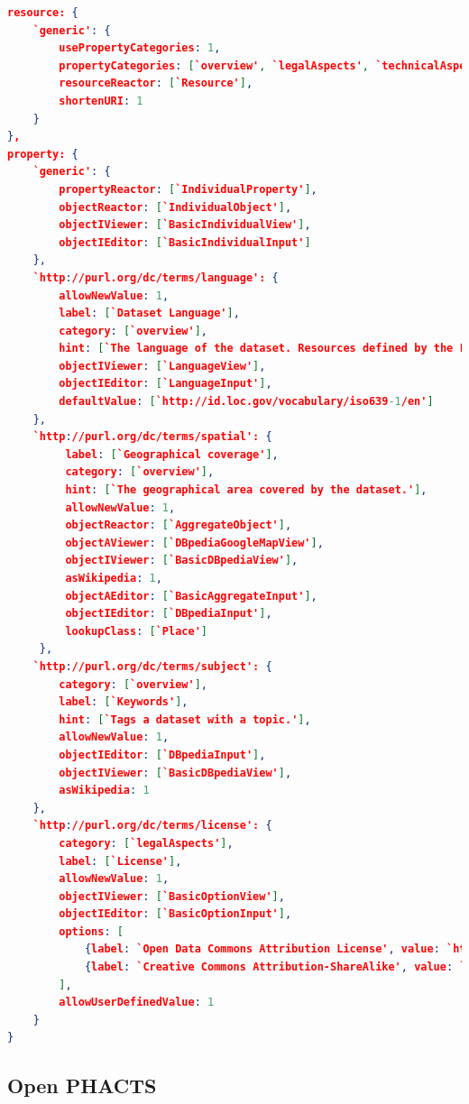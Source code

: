 \documentclass{acm_proc_article-sp}
\begin{document}
\begin{lstlisting}[language=json,firstnumber=1, label=code:config, caption=An excerpt of the LD-Reactor configuration for the RISIS metadata editor.]
resource: {
    `generic': {
        usePropertyCategories: 1,
        propertyCategories: [`overview', `legalAspects', `technicalAspects'],
        resourceReactor: [`Resource'],
        shortenURI: 1
    }
},
property: {
    `generic': {
        propertyReactor: [`IndividualProperty'],
        objectReactor: [`IndividualObject'],
        objectIViewer: [`BasicIndividualView'],
        objectIEditor: [`BasicIndividualInput']
    },
    `http://purl.org/dc/terms/language': {
        allowNewValue: 1,
        label: [`Dataset Language'],
        category: [`overview'],
        hint: [`The language of the dataset. Resources defined by the Library of Congress (http://id.loc.gov/vocabulary/iso639-1.html, http://id.loc.gov/vocabulary/iso639-2.html) SHOULD be used.'],
        objectIViewer: [`LanguageView'],
        objectIEditor: [`LanguageInput'],
        defaultValue: [`http://id.loc.gov/vocabulary/iso639-1/en']
    },
    `http://purl.org/dc/terms/spatial': {
         label: [`Geographical coverage'],
         category: [`overview'],
         hint: [`The geographical area covered by the dataset.'],
         allowNewValue: 1,
         objectReactor: [`AggregateObject'],
         objectAViewer: [`DBpediaGoogleMapView'],
         objectIViewer: [`BasicDBpediaView'],
         asWikipedia: 1,
         objectAEditor: [`BasicAggregateInput'],
         objectIEditor: [`DBpediaInput'],
         lookupClass: [`Place']
     },
    `http://purl.org/dc/terms/subject': {
        category: [`overview'],
        label: [`Keywords'],
        hint: [`Tags a dataset with a topic.'],
        allowNewValue: 1,
        objectIEditor: [`DBpediaInput'],
        objectIViewer: [`BasicDBpediaView'],
        asWikipedia: 1
    },
    `http://purl.org/dc/terms/license': {
        category: [`legalAspects'],
        label: [`License'],
        allowNewValue: 1,
        objectIViewer: [`BasicOptionView'],
        objectIEditor: [`BasicOptionInput'],
        options: [
            {label: `Open Data Commons Attribution License', value: `http://www.opendatacommons.org/licenses/by/'},
            {label: `Creative Commons Attribution-ShareAlike', value: `http://creativecommons.org/licenses/by-sa/3.0/'}
        ],
        allowUserDefinedValue: 1
    }   
}
\end{lstlisting}

\subsection{Open PHACTS}
\end{document}
